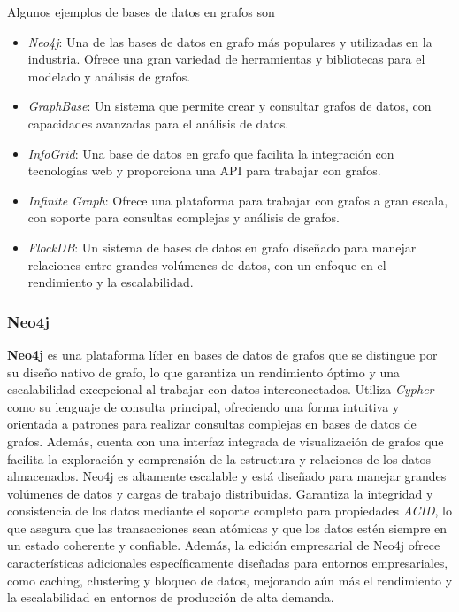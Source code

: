 \documentclass[pdflatex,sn-mathphys-num]{sn-jnl}
\theoremstyle{thmstyleone}%
\theoremstyle{thmstyletwo}%
\theoremstyle{thmstylethree}%
\begin{document}
Algunos ejemplos de bases de datos en grafos son 

\begin{itemize}
    \item \textit{Neo4j}: Una de las bases de datos en grafo más populares y utilizadas en la industria. Ofrece una gran variedad de herramientas y bibliotecas para el modelado y análisis de grafos.
    \item \textit{GraphBase}: Un sistema que permite crear y consultar grafos de datos, con capacidades avanzadas para el análisis de datos.
    \item \textit{InfoGrid}: Una base de datos en grafo que facilita la integración con tecnologías web y proporciona una API para trabajar con grafos.
    \item \textit{Infinite Graph}: Ofrece una plataforma para trabajar con grafos a gran escala, con soporte para consultas complejas y análisis de grafos.    
    \item \textit{FlockDB}: Un sistema de bases de datos en grafo diseñado para manejar relaciones entre grandes volúmenes de datos, con un enfoque en el rendimiento y la escalabilidad.
\end{itemize}

\subsubsection{Neo4j}\label{sec441}


\textbf{Neo4j}\cite{neo4j} es una plataforma líder en bases de datos de grafos que se distingue por su diseño nativo de grafo, lo que garantiza un rendimiento óptimo y una escalabilidad excepcional al trabajar con datos interconectados. Utiliza \textit{Cypher} como su lenguaje de consulta principal, ofreciendo una forma intuitiva y orientada a patrones para realizar consultas complejas en bases de datos de grafos. Además, cuenta con una interfaz integrada de visualización de grafos que facilita la exploración y comprensión de la estructura y relaciones de los datos almacenados. Neo4j es altamente escalable y está diseñado para manejar grandes volúmenes de datos y cargas de trabajo distribuidas. Garantiza la integridad y consistencia de los datos mediante el soporte completo para propiedades \textit{ACID}, lo que asegura que las transacciones sean atómicas y que los datos estén siempre en un estado coherente y confiable. Además, la edición empresarial de Neo4j ofrece características adicionales específicamente diseñadas para entornos empresariales, como caching, clustering y bloqueo de datos, mejorando aún más el rendimiento y la escalabilidad en entornos de producción de alta demanda.
\end{document}
